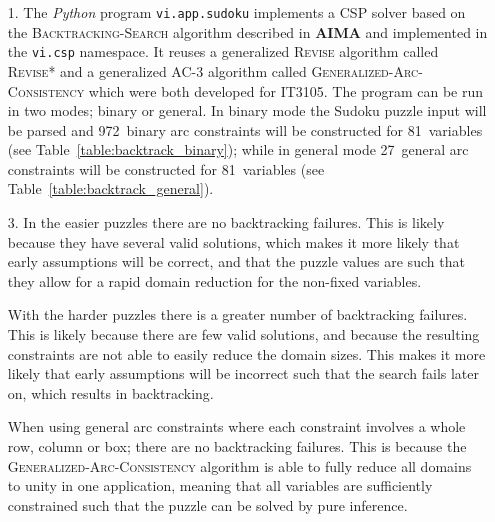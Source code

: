 \begin{enumerate}
\item[1.] The \textit{Python} program \texttt{vi.app.sudoku} implements a \ac{CSP} solver based on the \textsc{Backtracking-Search} algorithm described in \textbf{AIMA} and implemented in the \texttt{vi.csp} namespace. It reuses a generalized \textsc{Revise} algorithm called \textsc{Revise*} and a generalized \textsc{AC-3} algorithm called \textsc{Generalized-Arc-Consistency} which were both developed for \textsc{IT3105}. The program can be run in two modes; binary or general. In binary mode the Sudoku puzzle input will be parsed and 972~binary arc constraints will be constructed for 81~variables (see Table~\ref{table:backtrack_binary}); while in general mode 27~general arc constraints will be constructed for 81~variables (see Table~\ref{table:backtrack_general}).

\item[3.] In the easier puzzles there are no backtracking failures. This is likely because they have several valid solutions, which makes it more likely that early assumptions will be correct, and that the puzzle values are such that they allow for a rapid domain reduction for the non-fixed variables.

With the harder puzzles there is a greater number of backtracking failures. This is likely because there are few valid solutions, and because the resulting constraints are not able to easily reduce the domain sizes. This makes it more likely that early assumptions will be incorrect such that the search fails later on, which results in backtracking.

When using general arc constraints where each constraint involves a whole row, column or box; there are no backtracking failures. This is because the \textsc{Generalized-Arc-Consistency} algorithm is able to fully reduce all domains to unity in one application, meaning that all variables are sufficiently constrained such that the puzzle can be solved by pure inference.
\end{enumerate}

\newcommand{\sudokustatistics}[2]{
    \IfFileExists{/home/pveierland/permve-ntnu-tdt4136/assignment-5/report/generated/#1#2.txt}{}{
        \immediate\write18{
            mkdir -p /home/pveierland/permve-ntnu-tdt4136/assignment-5/report/generated &&
            /home/pveierland/permve-ntnu-it3105/vi/vi/app/sudoku/sudoku.py
            /home/pveierland/permve-ntnu-tdt4136/assignment-5/input/#1.txt #2
            > /home/pveierland/permve-ntnu-tdt4136/assignment-5/report/generated/#1#2.txt}}
    }

